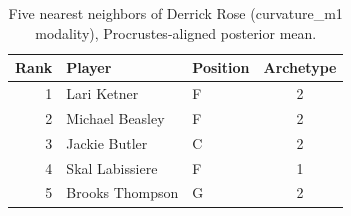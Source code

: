 \begin{table}[htbp]
  \centering\small
  \begin{tabular}{rllc}
    \toprule
    Rank & Player & Position & Archetype \\
    \midrule
    1 & Lari Ketner & F & 2 \\
    2 & Michael Beasley & F & 2 \\
    3 & Jackie Butler & C & 2 \\
    4 & Skal Labissiere & F & 1 \\
    5 & Brooks Thompson & G & 2 \\
    \bottomrule
  \end{tabular}
  \caption{Five nearest neighbors of Derrick Rose (curvature_m1 modality), Procrustes-aligned posterior mean.}
  \label{tab:Derrick_Rose_neighbors_curvature_m1}
\end{table}

